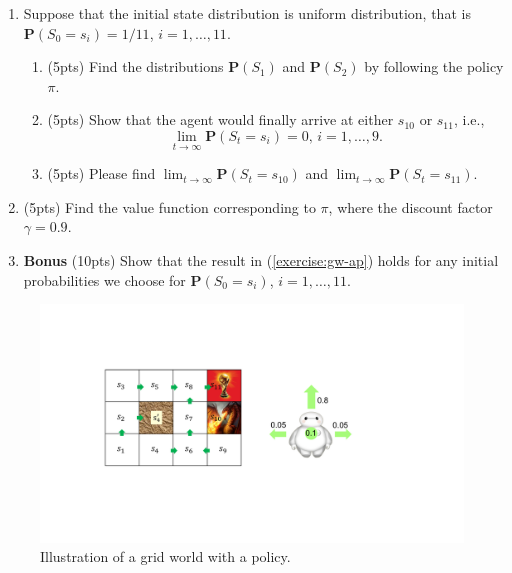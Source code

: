 \documentclass[11pt,letter,notitlepage]{article}
\begin{document}
\begin{exercise}
\begin{enumerate}
	\item Suppose that the initial state distribution is uniform distribution, that is $\mathbf{P}(S_0=s_i)=1/11$, $i=1,\ldots,11$.
		\begin{enumerate}
		    \item (5pts) Find the distributions $\mathbf{P}(S_1)$ and $\mathbf{P}(S_2)$ by following the policy $\pi$.
			\item\label{exercise:gw-ap} (5pts) Show that the agent would finally arrive at either $s_{10}$ or $s_{11}$, i.e., $$\lim_{t\rightarrow\infty}\mathbf{P}(S_t=s_i)=0,\,i=1,\ldots,9.$$
			\item (5pts) Please find $\lim_{t\rightarrow\infty}\mathbf{P}(S_t=s_{10})$ and $\lim_{t\rightarrow\infty}\mathbf{P}(S_t=s_{11})$.
		\end{enumerate}
	
	\item (5pts) Find the value function corresponding to $\pi$, where the discount factor $\gamma=0.9$.
	
	\item \textbf{Bonus} (10pts) Show that the result in (\ref{exercise:gw-ap}) holds for any initial probabilities we choose for $\mathbf{P}(S_0=s_i)$, $i=1,\ldots,11$.
\end{enumerate}

\end{exercise}

\begin{figure}[h]
	\centering
	\includegraphics[width=.8\textwidth]{images/Grid_World}
	\caption{Illustration of a grid world with a policy.}\label{fig:gridworld}
\end{figure}
\end{document}

